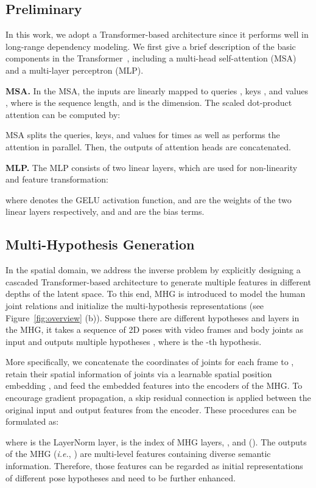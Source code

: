 \documentclass[10pt,twocolumn,letterpaper]{article}
\begin{document}
\subsection{Preliminary}
In this work, we adopt a Transformer-based architecture since it performs well in long-range dependency modeling. 
We first give a brief description of the basic components in the Transformer~\cite{Attention}, including a multi-head self-attention (MSA) and a multi-layer perceptron (MLP). 

\noindent \textbf{MSA.}
In the MSA, the inputs  are linearly mapped to queries , keys , and values , where  is the sequence length, and  is the dimension. 
The scaled dot-product attention can be computed by:

MSA splits the queries, keys, and values for  times as well as performs the attention in parallel.  
Then, the outputs of  attention heads are concatenated. 

\noindent \textbf{MLP.}
The MLP consists of two linear layers, which are used for non-linearity and feature transformation: 

where  denotes the GELU activation function,  and  are the weights of the two linear layers respectively, and  and  are the bias terms. 

\subsection{Multi-Hypothesis Generation}
In the spatial domain, we address the inverse problem by explicitly designing a cascaded Transformer-based architecture to generate multiple features in different depths of the latent space. 
To this end, MHG is introduced to model the human joint relations and initialize the multi-hypothesis representations (see Figure~\ref{fig:overview} (b)). 
Suppose there are  different hypotheses and  layers in the MHG, it takes a sequence of 2D poses  with  video frames and  body joints as input and outputs multiple hypotheses , where  is the -th hypothesis.

More specifically, we concatenate the  coordinates of joints for each frame to , retain their spatial information of joints via a learnable spatial position embedding , and feed the embedded features into the encoders of the MHG. 
To encourage gradient propagation, a skip residual connection is applied between the original input and output features from the encoder. 
These procedures can be formulated as: 

where  is the LayerNorm layer,  is the index of MHG layers, , and  (). 
The outputs of the MHG (\textit{i.e.}, ) are multi-level features containing diverse semantic information. 
Therefore, those features can be regarded as initial representations of different pose hypotheses and need to be further enhanced. 
\end{document}

